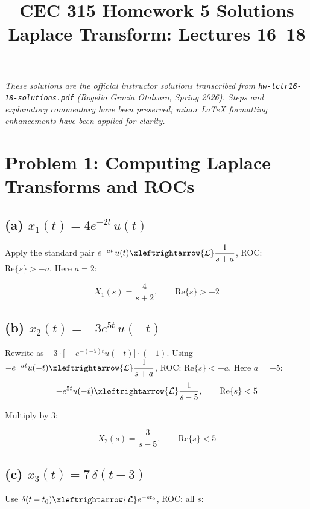 \documentclass[11pt]{article}
\title{\textbf{CEC 315 Homework 5 Solutions} \\ \large Laplace Transform: Lectures 16--18}
\author{}
\date{}
\newcommand{\lt}{\xleftrightarrow{\mathcal{L}}}
\newcommand{\Res}{\mathrm{Re}}
\begin{document}
\maketitle
\thispagestyle{fancy}

\noindent\emph{These solutions are the official instructor solutions transcribed from
\texttt{hw-lctr16-18-solutions.pdf} (Rogelio Gracia Otalvaro, Spring 2026).
Steps and explanatory commentary have been preserved; minor LaTeX formatting enhancements
have been applied for clarity.}

\section*{Problem 1: Computing Laplace Transforms and ROCs}

\subsection*{(a) $x_1(t) = 4 e^{-2t}\,u(t)$}

Apply the standard pair $e^{-at}\,u(t) \lt \dfrac{1}{s+a}$, ROC: $\Res\{s\} > -a$. Here $a=2$:

\begin{equation*}
\boxed{X_1(s) = \frac{4}{s+2}, \qquad \Res\{s\} > -2}
\end{equation*}

\subsection*{(b) $x_2(t) = -3 e^{5t}\,u(-t)$}

Rewrite as $-3\cdot\bigl[-e^{-(-5)t}u(-t)\bigr]\cdot(-1)$. Using $-e^{-at}u(-t) \lt \dfrac{1}{s+a}$, ROC: $\Res\{s\} < -a$. Here $a=-5$:
\[
-e^{5t}u(-t) \lt \frac{1}{s-5}, \qquad \Res\{s\} < 5
\]

Multiply by $3$:

\begin{equation*}
\boxed{X_2(s) = \frac{3}{s-5}, \qquad \Res\{s\} < 5}
\end{equation*}

\subsection*{(c) $x_3(t) = 7\,\delta(t-3)$}

Use $\delta(t-t_0) \lt e^{-st_0}$, ROC: all $s$:
\end{document}
